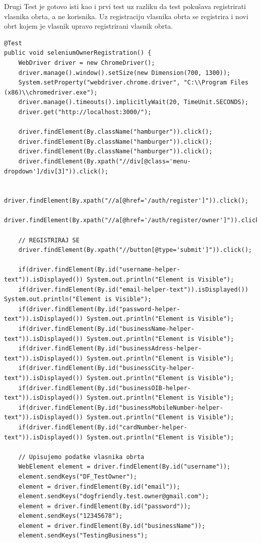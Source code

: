         \textbf{}{Drugi Test je gotovo isti kao i prvi test uz razliku da test pokušava registrirati vlasnika obrta, a ne korisnika. Uz registraciju vlasnika obrta se registrira i novi obrt kojem je vlasnik upravo registrirani vlasnik obrta.}
        \begin{lstlisting}
@Test
public void seleniumOwnerRegistration() {
    WebDriver driver = new ChromeDriver();
    driver.manage().window().setSize(new Dimension(700, 1300));
    System.setProperty("webdriver.chrome.driver", "C:\\Program Files (x86)\\chromedriver.exe");
    driver.manage().timeouts().implicitlyWait(20, TimeUnit.SECONDS);
    driver.get("http://localhost:3000/");

    driver.findElement(By.className("hamburger")).click();
    driver.findElement(By.className("hamburger")).click();
    driver.findElement(By.className("hamburger")).click();
    driver.findElement(By.xpath("//div[@class='menu-dropdown']/div[3]")).click();

    driver.findElement(By.xpath("//a[@href='/auth/register']")).click();
    driver.findElement(By.xpath("//a[@href='/auth/register/owner']")).click();

    // REGISTRIRAJ SE
    driver.findElement(By.xpath("//button[@type='submit']")).click();

    if(driver.findElement(By.id("username-helper-text")).isDisplayed()) System.out.println("Element is Visible");
    if(driver.findElement(By.id("email-helper-text")).isDisplayed()) System.out.println("Element is Visible");
    if(driver.findElement(By.id("password-helper-text")).isDisplayed()) System.out.println("Element is Visible");
    if(driver.findElement(By.id("businessName-helper-text")).isDisplayed()) System.out.println("Element is Visible");
    if(driver.findElement(By.id("businessAdress-helper-text")).isDisplayed()) System.out.println("Element is Visible");
    if(driver.findElement(By.id("businessCity-helper-text")).isDisplayed()) System.out.println("Element is Visible");
    if(driver.findElement(By.id("businessOIB-helper-text")).isDisplayed()) System.out.println("Element is Visible");
    if(driver.findElement(By.id("businessMobileNumber-helper-text")).isDisplayed()) System.out.println("Element is Visible");
    if(driver.findElement(By.id("cardNumber-helper-text")).isDisplayed()) System.out.println("Element is Visible");

    // Upisujemo podatke vlasnika obrta
    WebElement element = driver.findElement(By.id("username"));
    element.sendKeys("DF_TestOwner");
    element = driver.findElement(By.id("email"));
    element.sendKeys("dogfriendly.test.owner@gmail.com");
    element = driver.findElement(By.id("password"));
    element.sendKeys("12345678");
    element = driver.findElement(By.id("businessName"));
    element.sendKeys("TestingBusiness");


\end{lstlisting}
